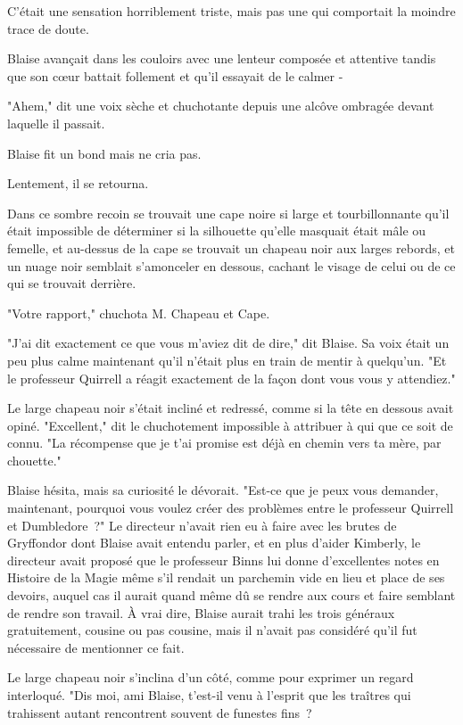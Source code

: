 C'était une sensation horriblement triste, mais pas une qui comportait la moindre trace de doute.


Blaise avançait dans les couloirs avec une lenteur composée et attentive tandis que son cœur battait follement et qu'il essayait de le calmer -

"Ahem," dit une voix sèche et chuchotante depuis une alcôve ombragée devant laquelle il passait.

Blaise fit un bond mais ne cria pas.

Lentement, il se retourna.

Dans ce sombre recoin se trouvait une cape noire si large et tourbillonnante qu'il était impossible de déterminer si la silhouette qu'elle masquait était mâle ou femelle, et au-dessus de la cape se trouvait un chapeau noir aux larges rebords, et un nuage noir semblait s'amonceler en dessous, cachant le visage de celui ou de ce qui se trouvait derrière.

"Votre rapport," chuchota M. Chapeau et Cape.

"J'ai dit exactement ce que vous m'aviez dit de dire," dit Blaise. Sa voix était un peu plus calme maintenant qu'il n'était plus en train de mentir à quelqu'un. "Et le professeur Quirrell a réagit exactement de la façon dont vous vous y attendiez."

Le large chapeau noir s'était incliné et redressé, comme si la tête en dessous avait opiné. "Excellent," dit le chuchotement impossible à attribuer à qui que ce soit de connu. "La récompense que je t'ai promise est déjà en chemin vers ta mère, par chouette."

Blaise hésita, mais sa curiosité le dévorait. "Est-ce que je peux vous demander, maintenant, pourquoi vous voulez créer des problèmes entre le professeur Quirrell et Dumbledore~?" Le directeur n'avait rien eu à faire avec les brutes de Gryffondor dont Blaise avait entendu parler, et en plus d'aider Kimberly, le directeur avait proposé que le professeur Binns lui donne d'excellentes notes en Histoire de la Magie même s'il rendait un parchemin vide en lieu et place de ses devoirs, auquel cas il aurait quand même dû se rendre aux cours et faire semblant de rendre son travail. À vrai dire, Blaise aurait trahi les trois généraux gratuitement, cousine ou pas cousine, mais il n'avait pas considéré qu'il fut nécessaire de mentionner ce fait.

Le large chapeau noir s'inclina d'un côté, comme pour exprimer un regard interloqué. "Dis moi, ami Blaise, t'est-il venu à l'esprit que les traîtres qui trahissent autant rencontrent souvent de funestes fins~?

